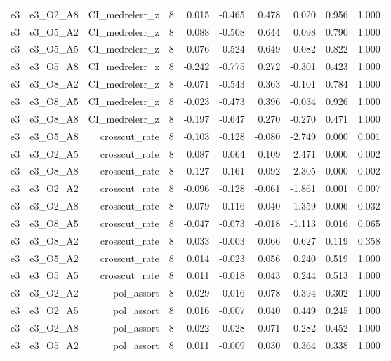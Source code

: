 \documentclass[11pt]{article}
\begin{document}
\begin{landscape}
\begin{longtable}{@{}lrrrrrrrrr@{}}
e3 & e3\_O2\_A8 & CI\_medrelerr\_z & 8 & 0.015 & -0.465 & 0.478 & 0.020 & 0.956 & 1.000 \\
e3 & e3\_O5\_A2 & CI\_medrelerr\_z & 8 & 0.088 & -0.508 & 0.644 & 0.098 & 0.790 & 1.000 \\
e3 & e3\_O5\_A5 & CI\_medrelerr\_z & 8 & 0.076 & -0.524 & 0.649 & 0.082 & 0.822 & 1.000 \\
e3 & e3\_O5\_A8 & CI\_medrelerr\_z & 8 & -0.242 & -0.775 & 0.272 & -0.301 & 0.423 & 1.000 \\
e3 & e3\_O8\_A2 & CI\_medrelerr\_z & 8 & -0.071 & -0.543 & 0.363 & -0.101 & 0.784 & 1.000 \\
e3 & e3\_O8\_A5 & CI\_medrelerr\_z & 8 & -0.023 & -0.473 & 0.396 & -0.034 & 0.926 & 1.000 \\
e3 & e3\_O8\_A8 & CI\_medrelerr\_z & 8 & -0.197 & -0.647 & 0.270 & -0.270 & 0.471 & 1.000 \\
e3 & e3\_O5\_A8 & crosscut\_rate & 8 & -0.103 & -0.128 & -0.080 & -2.749 & 0.000 & 0.001 \\
e3 & e3\_O2\_A5 & crosscut\_rate & 8 & 0.087 & 0.064 & 0.109 & 2.471 & 0.000 & 0.002 \\
e3 & e3\_O8\_A8 & crosscut\_rate & 8 & -0.127 & -0.161 & -0.092 & -2.305 & 0.000 & 0.002 \\
e3 & e3\_O2\_A2 & crosscut\_rate & 8 & -0.096 & -0.128 & -0.061 & -1.861 & 0.001 & 0.007 \\
e3 & e3\_O2\_A8 & crosscut\_rate & 8 & -0.079 & -0.116 & -0.040 & -1.359 & 0.006 & 0.032 \\
e3 & e3\_O8\_A5 & crosscut\_rate & 8 & -0.047 & -0.073 & -0.018 & -1.113 & 0.016 & 0.065 \\
e3 & e3\_O8\_A2 & crosscut\_rate & 8 & 0.033 & -0.003 & 0.066 & 0.627 & 0.119 & 0.358 \\
e3 & e3\_O5\_A2 & crosscut\_rate & 8 & 0.014 & -0.023 & 0.056 & 0.240 & 0.519 & 1.000 \\
e3 & e3\_O5\_A5 & crosscut\_rate & 8 & 0.011 & -0.018 & 0.043 & 0.244 & 0.513 & 1.000 \\
e3 & e3\_O2\_A2 & pol\_assort & 8 & 0.029 & -0.016 & 0.078 & 0.394 & 0.302 & 1.000 \\
e3 & e3\_O2\_A5 & pol\_assort & 8 & 0.016 & -0.007 & 0.040 & 0.449 & 0.245 & 1.000 \\
e3 & e3\_O2\_A8 & pol\_assort & 8 & 0.022 & -0.028 & 0.071 & 0.282 & 0.452 & 1.000 \\
e3 & e3\_O5\_A2 & pol\_assort & 8 & 0.011 & -0.009 & 0.030 & 0.364 & 0.338 & 1.000 \\

\end{longtable}
\end{landscape}
\end{document}
